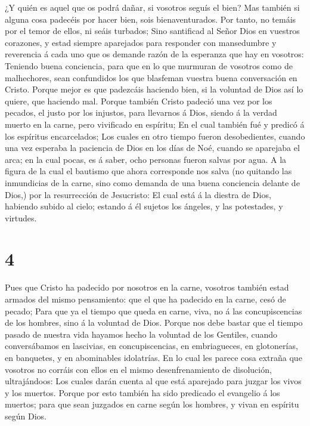  ¿Y quién es aquel que os podrá dañar, si vosotros seguís
el bien?  Mas también si alguna cosa padecéis por hacer
bien, sois bienaventurados. Por tanto, no temáis por el temor de ellos,
ni seáis turbados;  Sino santificad al Señor Dios en
vuestros corazones, y estad siempre aparejados para responder con
mansedumbre y reverencia á cada uno que os demande razón de la esperanza
que hay en vosotros:  Teniendo buena conciencia, para que
en lo que murmuran de vosotros como de malhechores, sean confundidos los
que blasfeman vuestra buena conversación en Cristo.  Porque
mejor es que padezcáis haciendo bien, si la voluntad de Dios así lo
quiere, que haciendo mal.  Porque también Cristo padeció
una vez por los pecados, el justo por los injustos, para llevarnos á
Dios, siendo á la verdad muerto en la carne, pero vivificado en
espíritu;  En el cual también fué y predicó á los espíritus
encarcelados;  Los cuales en otro tiempo fueron
desobedientes, cuando una vez esperaba la paciencia de Dios en los días
de Noé, cuando se aparejaba el arca; en la cual pocas, es á saber, ocho
personas fueron salvas por agua.  A la figura de la cual el
bautismo que ahora corresponde nos salva (no quitando las inmundicias de
la carne, sino como demanda de una buena conciencia delante de Dios,)
por la resurrección de Jesucristo:  El cual está á la
diestra de Dios, habiendo subido al cielo; estando á él sujetos los
ángeles, y las potestades, y virtudes.

\hypertarget{section-3}{%
\section{4}\label{section-3}}

 Pues que Cristo ha padecido por nosotros en la carne,
vosotros también estad armados del mismo pensamiento: que el que ha
padecido en la carne, cesó de pecado;  Para que ya el tiempo
que queda en carne, viva, no á las concupiscencias de los hombres, sino
á la voluntad de Dios.  Porque nos debe bastar que el tiempo
pasado de nuestra vida hayamos hecho la voluntad de los Gentiles, cuando
conversábamos en lascivias, en concupiscencias, en embriagueces, en
glotonerías, en banquetes, y en abominables idolatrías.  En
lo cual les parece cosa extraña que vosotros no corráis con ellos en el
mismo desenfrenamiento de disolución, ultrajándoos:  Los
cuales darán cuenta al que está aparejado para juzgar los vivos y los
muertos.  Porque por esto también ha sido predicado el
evangelio á los muertos; para que sean juzgados en carne según los
hombres, y vivan en espíritu según Dios.

